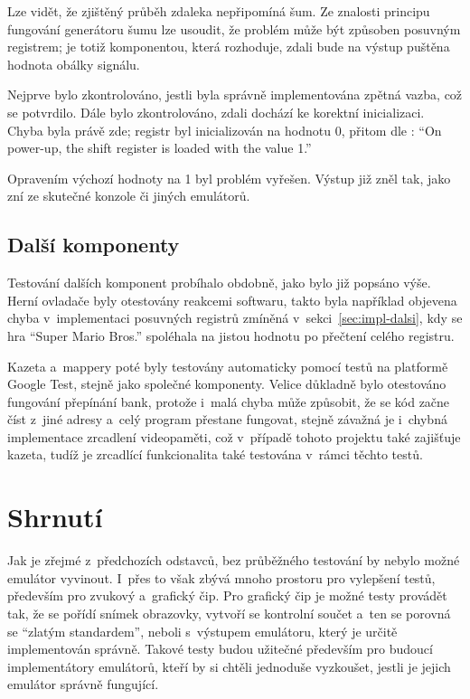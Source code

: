 Lze vidět, že zjištěný průběh zdaleka nepřipomíná šum. Ze znalosti principu fungování generátoru šumu lze usoudit, že problém může být způsoben posuvným registrem; je totiž komponentou, která rozhoduje, zdali bude na výstup puštěna hodnota obálky signálu.

Nejprve bylo zkontrolováno, jestli byla správně implementována zpětná vazba, což se potvrdilo. Dále bylo zkontrolováno, zdali dochází ke korektní inicializaci. Chyba byla právě zde; registr byl inicializován na hodnotu 0, přitom dle \cite{Nesdev:apu-noise}: \enquote{On power-up, the shift register is loaded with the value 1.}

Opravením výchozí hodnoty na 1 byl problém vyřešen. Výstup již zněl tak, jako zní ze skutečné konzole či jiných emulátorů.

\subsection{Další komponenty}
Testování dalších komponent probíhalo obdobně, jako bylo již popsáno výše. Herní ovladače byly otestovány reakcemi softwaru, takto byla například objevena chyba v~implementaci posuvných registrů zmíněná v~sekci~\ref{sec:impl-dalsi}, kdy se hra \enquote{Super Mario Bros.} spoléhala na jistou hodnotu po přečtení celého registru.

Kazeta a~mappery poté byly testovány automaticky pomocí testů na platformě Google Test, stejně jako společné komponenty. Velice důkladně bylo otestováno fungování přepínání bank, protože i~malá chyba může způsobit, že se kód začne číst z~jiné adresy a~celý program přestane fungovat, stejně závažná je i~chybná implementace zrcadlení videopaměti, což v~případě tohoto projektu také zajišťuje kazeta, tudíž je zrcadlící funkcionalita také testována v~rámci těchto testů.

\section{Shrnutí}
Jak je zřejmé z~předchozích odstavců, bez průběžného testování by nebylo možné emulátor vyvinout. I~přes to však zbývá mnoho prostoru pro vylepšení testů, především pro zvukový a~grafický čip. Pro grafický čip je možné testy provádět tak, že se pořídí snímek obrazovky, vytvoří se kontrolní součet a~ten se porovná se \enquote{zlatým standardem}, neboli s~výstupem emulátoru, který je určitě implementován správně. Takové testy budou užitečné především pro budoucí implementátory emulátorů, kteří by si chtěli jednoduše vyzkoušet, jestli je jejich emulátor správně fungující.

